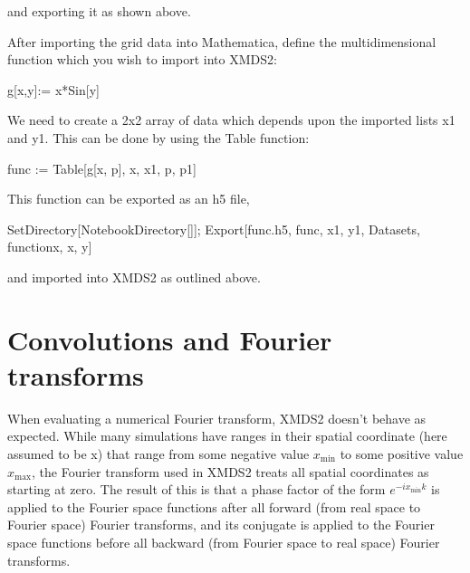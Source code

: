 \documentclass[letterpaper,10pt,english]{sphinxmanual}
\begin{document}
\sphinxAtStartPar
and exporting it as shown above.

\sphinxAtStartPar
After importing the grid data into Mathematica, define the multi\sphinxhyphen{}dimensional function which you wish to import into XMDS2:

\begin{sphinxVerbatim}[commandchars=\\\{\}]
g[x\PYGZus{},y\PYGZus{}]:= x*Sin[y]
\end{sphinxVerbatim}

\sphinxAtStartPar
We need to create a 2x2 array of data which depends upon the imported lists x1 and y1. This can be done by using the Table function:

\begin{sphinxVerbatim}[commandchars=\\\{\}]
func := Table[g[x, p], \PYGZob{}x, x1\PYGZcb{}, \PYGZob{}p, p1\PYGZcb{}]
\end{sphinxVerbatim}

\sphinxAtStartPar
This function can be exported as an h5 file,

\begin{sphinxVerbatim}[commandchars=\\\{\}]
SetDirectory[NotebookDirectory[]];
Export[\PYGZdq{}func.h5\PYGZdq{}, \PYGZob{}func, x1, y1\PYGZcb{}, \PYGZob{}\PYGZdq{}Datasets\PYGZdq{}, \PYGZob{} \PYGZdq{}function\PYGZus{}x\PYGZdq{}, \PYGZdq{}x\PYGZdq{}, \PYGZdq{}y\PYGZdq{}\PYGZcb{}\PYGZcb{}]
\end{sphinxVerbatim}

\sphinxAtStartPar
and imported into XMDS2 as outlined above.

\ignorespaces 

\section{Convolutions and Fourier transforms}
\label{\detokenize{advanced_topics:convolutions-and-fourier-transforms}}\label{\detokenize{advanced_topics:convolutions}}\label{\detokenize{advanced_topics:index-2}}
\sphinxAtStartPar
When evaluating a numerical Fourier transform, XMDS2 doesn’t behave as expected. While many simulations have ranges in their spatial coordinate (here assumed to be x) that range from some negative value \(x_\text{min}\) to some positive value \(x_\text{max}\), the Fourier transform used in XMDS2 treats all spatial coordinates as starting at zero. The result of this is that a phase factor of the form \(e^{-i x_\text{min} k}\) is applied to the Fourier space functions after all forward (from real space to Fourier space) Fourier transforms, and its conjugate is applied to the Fourier space functions before all backward (from Fourier space to real space) Fourier transforms.
\end{document}
